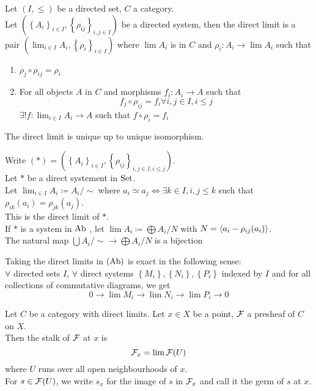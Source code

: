 \documentclass[../main.tex]{subfiles}
\begin{document}
\begin{defn} 
	Let $( I, \leq ) $ be a directed set, $C$ a category.\\
	Let $ \left( \left\{ A_i \right\}_{i \in I} , \left\{ \rho_{ij}  \right\}_{i,j \in I} \right) $ be a directed system, then the direct limit is a pair
	$( \lim_{i \in I} A_i, \left\{ \rho_i \right\}_{i \in I} ) $ where $\lim A_i$ is in $C$ and $\rho_i: A_i \to \lim A_i$ such that 
	\begin{enumerate}
	\item $\rho_j \circ \rho_{ij }= \rho_i $ 
	\item For all objects $A$ in $C$ and morphisms $f_i: A_i \to A$ such that 
		\[ 
		f_j \circ \rho_{ij} = f_i \forall i,j \in I, i \leq j
		\]
	$\exists ! f: \lim_{i \in I} A_i \to A$ such that $f\circ \rho_i = f_i$ 	
	\end{enumerate}
\end{defn}
\begin{rmq}
The direct limit is unique up to unique isomorphism.
\end{rmq}
\begin{exemple}
Write $( \ast) =(  \left\{ A_i \right\}_{i \in I} , \left\{ \rho_{ij}  \right\} _{i,j \in I ,i \leq j} ) $.\\
Let $\ast$ be a direct systement in $\operatorname{Set}$.\\
Let $\lim_{i \in I} A_i \coloneqq A_i / \sim$ where $a_i \simeq a_j\iff \exists k \in I, i,j \leq k$ such that $\rho_{ik} ( a_i) = \rho_{j k} ( a_j) $.\\
This is the direct limit of $\ast$.\\
If $\ast$ is a system in $\operatorname{Ab}$ , let $\lim A_i \coloneqq  \bigoplus A_i /N$ with $N= \left\langle a_i - \rho_{ij}( a_i) \right\rangle$.\\
The natural map $\bigcup A_i / \sim \to \bigoplus A_i /N$ is a bijection
\end{exemple}
\begin{rmq}
Taking the direct limits in $(\operatorname{Ab}) $ is exact in the following sense:\\
$\forall$ directed sets $I$, $\forall$ direct systems $\left\{ M_i \right\} , \left\{ N_i \right\} , \left\{ P_i \right\} $ indexed by $I$ and for all collections of commutative diagrams, we get
\[ 
0 \to \lim M_i \to \lim N_i \to \lim P_i \to 0
\]
\end{rmq}
\begin{defn}
	Let $C$ be a category with direct limits. Let $x\in X$ be a point, $\mathcal{F}$ a presheaf of $C$ on $X$.\\
	Then the stalk of $\mathcal{F}$ at $x$ is
	\[ 
\mathcal{F}_x = \lim \mathcal{F}(U) 	
	\]
	where $U$ runs over all open neighbourhoods of $x$.\\
For $s\in \mathcal{F}( U) $, we write $s_x$ for the image of $s$ in $\mathcal{F}_x$ and call it the germ of $s$ at $x$.
	
\end{defn}
\end{document}
